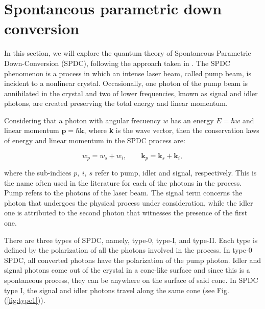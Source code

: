 \documentclass[12pt]{book}
\begin{document}
\section{Spontaneous parametric down conversion}



In this section, we will explore the quantum theory of Spontaneous Parametric Down-Conversion (SPDC), following the approach taken in \cite{procopio,multiphoton}. The SPDC phenomenon is a process in which an intense laser beam, called pump beam, is incident to a nonlinear crystal. Occasionally, one photon of the pump beam is annihilated in the crystal and two of lower frequencies, known as signal and idler photons, are created preserving the total energy and linear momentum.

Considering that a photon with angular frecuency $w$ has an energy $E=\hbar w$ and linear momentum $\mathbf{p} = \hbar \mathbf{k}$, where \textbf{k} is the wave vector, then the conservation laws of energy and linear momentum in the SPDC process are: 


\begin{equation}
w_{p}=w_{s}+w_{i}, \qquad \mathbf{k}_{p}=\mathbf{k}_{s}+\mathbf{k}_{i}, \label{conservation}
\end{equation}

where the sub-indices $p,~i,~s$ refer to pump, idler and signal, respectively. This is the name often used in the literature for each of the photons in the process. Pump refers to the photons of the laser beam. The signal term concerns the photon that undergoes the physical process under consideration, while the idler one is attributed to the second photon that witnesses the presence of the first one.

There are three types of SPDC, namely, type-0, type-I, and type-II. Each type is defined by the polarization of all the photons involved in the process. In type-0 SPDC, all converted photons have the polarization of the pump photon. Idler and signal photons come out of the crystal in a cone-like surface and since this is a spontaneous process, they can be anywhere on the surface of said cone. In SPDC type I, the signal and idler photons travel along the same cone (see Fig. (\ref{fig:type1})).
\end{document}
